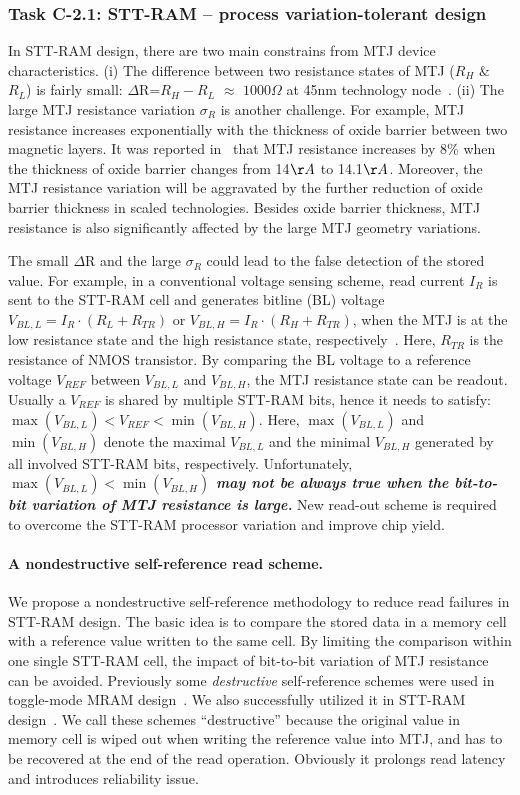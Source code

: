 \subsubsection{Task C-2.1: STT-RAM -- process variation-tolerant design}
In STT-RAM design, there are two main constrains from MTJ device characteristics. (i) The difference between two resistance states of MTJ ($R_H$ $\&$ $R_L$) is fairly small: $\Delta$R=$R_H-R_L$ $\approx$ $1000\Omega$ at 45nm technology node~\cite{Li09}. (ii) The large MTJ resistance variation $\sigma_R$ is another challenge. For example, MTJ resistance increases exponentially with the thickness of oxide barrier between two magnetic layers. It was reported in~\cite{Tehrani00} that MTJ resistance increases by 8\% when the thickness of oxide barrier changes from 14${\AA}$ to 14.1${\AA}$. Moreover, the MTJ resistance variation will be aggravated by the further reduction of oxide barrier thickness in scaled technologies. Besides oxide barrier thickness, MTJ resistance is also significantly affected by the large MTJ geometry variations.

The small $\Delta$R and the large $\sigma_R$ could lead to the false detection of the stored value. For example, in a conventional voltage sensing scheme, read current $I_R$ is sent to the STT-RAM cell and generates bitline (BL) voltage $V_{BL,L}=I_R\cdot(R_L+R_{TR})$ or $V_{BL,H}=I_R\cdot(R_H+R_{TR})$, when the MTJ is at the low resistance state and the high resistance state, respectively~\cite{Li09}. Here, $R_{TR}$ is the resistance of NMOS transistor. By comparing the BL voltage to a reference voltage $V_{REF}$ between $V_{BL,L}$ and $V_{BL,H}$, the MTJ resistance state can be readout. Usually a $V_{REF}$ is shared by multiple STT-RAM bits, hence it needs to satisfy: $\max(V_{BL,L})<V_{REF}<\min(V_{BL,H})$. Here, $\max(V_{BL,L})$ and $\min(V_{BL,H})$ denote the maximal $V_{BL,L}$ and the minimal $V_{BL,H}$ generated by all involved STT-RAM bits, respectively. Unfortunately, \textbf{\emph{$\max(V_{BL,L})<\min(V_{BL,H})$ may not be always true when the bit-to-bit variation of MTJ resistance is large.}} New read-out scheme is required to overcome the STT-RAM processor variation and improve chip yield.

\paragraph{A nondestructive self-reference read scheme.} We propose a nondestructive self-reference methodology to reduce read failures in STT-RAM design. The basic idea is to compare the stored data in a memory cell with a reference value written to the same cell. By limiting the comparison within one single STT-RAM cell, the impact of bit-to-bit variation of MTJ resistance can be avoided. Previously some \emph{destructive} self-reference schemes were used in toggle-mode MRAM design~\cite{Tanizaki06,Jeong03}. We also successfully utilized it in STT-RAM design~\cite{Li:147723,Chen:147727}. We call these schemes ``destructive'' because the original value in memory cell is wiped out when writing the reference value into MTJ, and has to be recovered at the end of the read operation. Obviously it prolongs read latency and introduces reliability issue.

